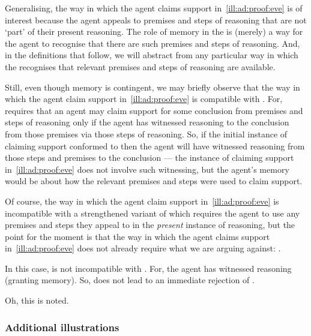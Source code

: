 \begin{note}
  Generalising, the way in which the agent claims support in~\autoref{ill:ad:proof:eve} is of interest because the agent appeals to premises and steps of reasoning that are not `part' of their present reasoning.
  The role of memory in the  is (merely) a way for the agent to recognise that there are such premises and steps of reasoning.
  And, in the definitions that follow, we will abstract from any particular way in which the recognises that relevant premises and steps of reasoning are available.

  Still, even though memory is contingent, we may briefly observe that the way in which the agent claim support in~\autoref{ill:ad:proof:eve} is compatible with \ESU{}.
  For, \ESU{} requires that an agent may claim support for some conclusion from premises and steps of reasoning only if the agent has witnessed reasoning to the conclusion from those premises via those steps of reasoning.
  So, if the initial instance of claiming support conformed to \ESU{} then the agent will have witnessed reasoning from those steps and premises to the conclusion --- the instance of claiming support in~\autoref{ill:ad:proof:eve} does not involve such witnessing, but the agent's memory would be about how the relevant premises and steps were used to claim support.

  Of course, the way in which the agent claim support in~\autoref{ill:ad:proof:eve} is incompatible with a strengthened variant of \ESU{} which requires the agent to use any premises and steps they appeal to in the \emph{present} instance of reasoning, but the point for the moment is that the way in which the agent claims support in~\autoref{ill:ad:proof:eve} does not already require what we are arguing against: \ESU{}.
\end{note}

\begin{note}
  \color{red}
  In this case, \adB{} is not incompatible with \ESU{}.
  For, the agent has witnessed reasoning (granting memory).
  So, \ESU{} does not lead to an immediate rejection of \adB{}.

  Oh, this is noted.
\end{note}

\subsubsection{Additional illustrations}

